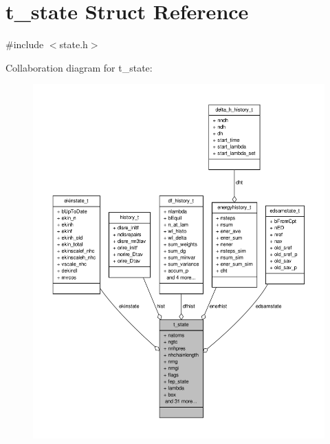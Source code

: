 \hypertarget{structt__state}{\section{t\-\_\-state \-Struct \-Reference}
\label{structt__state}
}


{\ttfamily \#include $<$state.\-h$>$}



\-Collaboration diagram for t\-\_\-state\-:
\nopagebreak
\begin{figure}[H]
\begin{center}
\leavevmode
\includegraphics[width=350pt]{structt__state__coll__graph}
\end{center}
\end{figure}
